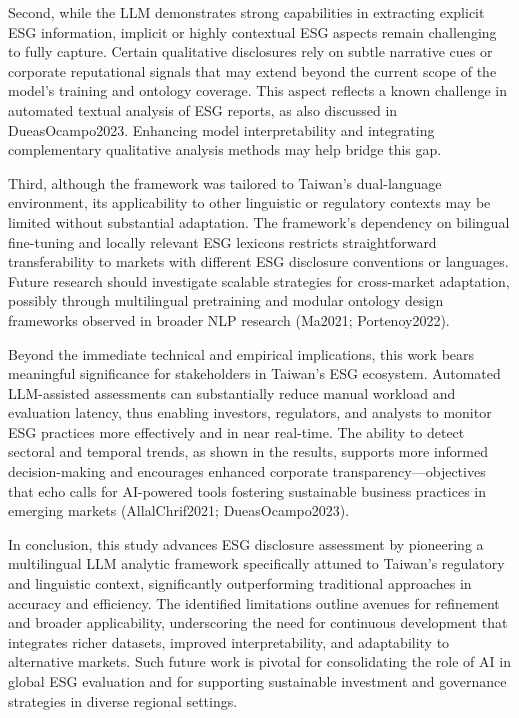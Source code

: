 \documentclass[
  12pt,
]{article}
\begin{document}
Second, while the LLM demonstrates strong capabilities in extracting
explicit ESG information, implicit or highly contextual ESG aspects
remain challenging to fully capture. Certain qualitative disclosures
rely on subtle narrative cues or corporate reputational signals that may
extend beyond the current scope of the model's training and ontology
coverage. This aspect reflects a known challenge in automated textual
analysis of ESG reports, as also discussed in DueasOcampo2023. Enhancing
model interpretability and integrating complementary qualitative
analysis methods may help bridge this gap.

Third, although the framework was tailored to Taiwan's dual-language
environment, its applicability to other linguistic or regulatory
contexts may be limited without substantial adaptation. The framework's
dependency on bilingual fine-tuning and locally relevant ESG lexicons
restricts straightforward transferability to markets with different ESG
disclosure conventions or languages. Future research should investigate
scalable strategies for cross-market adaptation, possibly through
multilingual pretraining and modular ontology design frameworks observed
in broader NLP research (Ma2021; Portenoy2022).

Beyond the immediate technical and empirical implications, this work
bears meaningful significance for stakeholders in Taiwan's ESG
ecosystem. Automated LLM-assisted assessments can substantially reduce
manual workload and evaluation latency, thus enabling investors,
regulators, and analysts to monitor ESG practices more effectively and
in near real-time. The ability to detect sectoral and temporal trends,
as shown in the results, supports more informed decision-making and
encourages enhanced corporate transparency---objectives that echo calls
for AI-powered tools fostering sustainable business practices in
emerging markets (AllalChrif2021; DueasOcampo2023).

In conclusion, this study advances ESG disclosure assessment by
pioneering a multilingual LLM analytic framework specifically attuned to
Taiwan's regulatory and linguistic context, significantly outperforming
traditional approaches in accuracy and efficiency. The identified
limitations outline avenues for refinement and broader applicability,
underscoring the need for continuous development that integrates richer
datasets, improved interpretability, and adaptability to alternative
markets. Such future work is pivotal for consolidating the role of AI in
global ESG evaluation and for supporting sustainable investment and
governance strategies in diverse regional settings.
\end{document}
